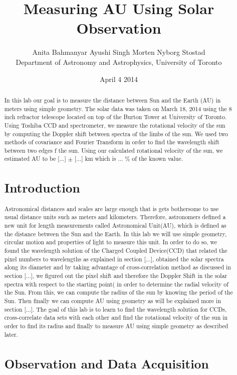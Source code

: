 \documentclass[letterpaper,12pt]{article}
\title{Measuring AU Using Solar Observation}
\author{Anita Bahmanyar \qquad Ayushi Singh \qquad Morten Nyborg Stostad \\Department of Astronomy and Astrophysics, University of Toronto}
\affil{\small {Written by: Anita Bahmanyar}}
\affil{\small {anita.bahmanyar@mail.utoronto.ca}}
\affil{\small {Student Number: 998909098}}
\date{April 4 2014}
\begin{document}
\maketitle

\begin{abstract}
\label{abstract}
In this lab our goal is to measure the distance between Sun and the Earth (AU) in meters using simple geometry. The solar data was taken on March 18, 2014 using the 8 inch refractor telescope located on top of the Burton Tower at University of Toronto. Using Toshiba CCD and spectrometer, we measure the rotational velocity of the sun by computing the Doppler shift between spectra of the limbs of the sun. We used two methods of covariance and Fourier Transform in order to find the wavelength shift between two edges f the sun. Using our calculated rotational velocity of the sun, we estimated AU to be [...] $\pm$ [...] km which is ... \% of the known value.

\section{Introduction}
\label{sec:introduction}
Astronomical distances and scales are large enough that is gets bothersome to use usual distance units such as meters and kilometers. Therefore, astronomers defined a new unit for length measurements called Astronomical Unit(AU), which is defined as the distance between the Sun and the Earth. In this lab we will use simple geometry, circular motion and properties of light to measure this unit. In order to do so, we found the wavelength solution of the Charged Coupled Device(CCD) that related the pixel numbers to wavelengths as explained in section [...], obtained the solar spectra along its diameter and by taking advantage of cross-correlation method as discussed in section [...], we figured out the pixel shift and therefore the Doppler Shift in the solar spectra with respect to the starting point( in order to determine the radial velocity of the Sun. From this, we can compute the radius of the sun by knowing the period of the Sun. Then finally we can compute AU using geometry as will be explained more in section [...]. The goal of this lab is to learn to find the wavelength solution for CCDs, cross-correlate data sets with each other and find the rotational velocity of the sun in order to find its radius and finally to measure AU using simple geometry as described later.


 
\section{Observation and Data Acquisition}
\label{sec:observationanddataacquisition}

\end{abstract}
\end{document}
